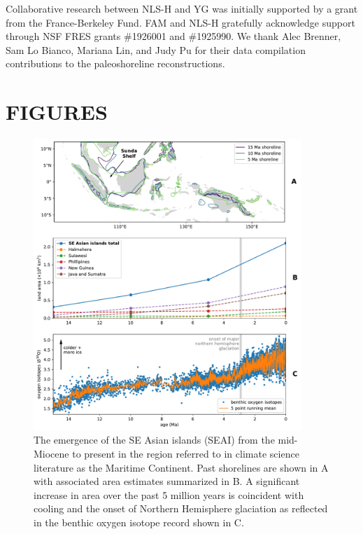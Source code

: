 \documentclass[11pt,letterpaper]{article}
\begin{document}
Collaborative research between NLS-H and YG was initially supported by a grant from the France-Berkeley Fund. FAM and NLS-H gratefully acknowledge support through NSF FRES grants \#1926001 and \#1925990. We thank Alec Brenner, Sam Lo Bianco, Mariana Lin, and Judy Pu for their data compilation contributions to the paleoshoreline reconstructions. 

\clearpage
\newpage

\section*{FIGURES}

\begin{figure}[h!]
    \centering
    \includegraphics[width=0.9\textwidth]{Figures/shoreline_growth.pdf}
    \caption{The emergence of the SE Asian islands (SEAI) from the mid-Miocene to present in the region referred to in climate science literature as the Maritime Continent. Past shorelines are shown in A with associated area estimates summarized in B. A significant increase in area over the past 5 million years is coincident with cooling and the onset of Northern Hemisphere glaciation as reflected in the benthic oxygen isotope record \cite{Zachos2008a} shown in C.}
    \label{fig:shoreline_growth}
\end{figure}
\end{document}
